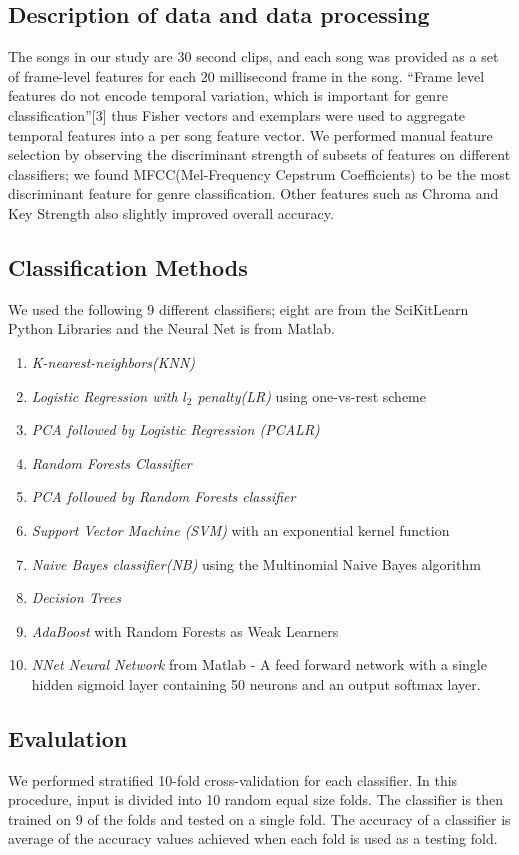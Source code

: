 \documentclass{article} %
\begin{document}
\subsection{Description of data and data processing}
The songs in our study are 30 second clips, and each song was provided as a set of frame-level features for each 20 millisecond frame in the song. ``Frame level features do not encode temporal variation, which is important for genre classification''[3] thus Fisher vectors and exemplars were used to aggregate temporal features into a per song feature vector. 
We performed manual feature selection by observing the discriminant strength of subsets of features on different classifiers; we found MFCC(Mel-Frequency Cepstrum Coefficients) to be the most discriminant feature for genre classification. Other features such as Chroma and Key Strength also slightly improved overall accuracy. 

\subsection{Classification Methods}
We used the following 9 different classifiers; eight are from the SciKitLearn Python Libraries and the Neural Net is from Matlab. 
\begin{enumerate}
    \item \textit{K-nearest-neighbors(KNN)} 
    \item \textit{Logistic Regression with $l_2$ penalty(LR)} using one-vs-rest scheme 
    \item \textit{PCA followed by Logistic Regression (PCALR)}
    \item \textit{Random Forests Classifier}
    \item \textit{PCA followed by Random Forests classifier}
    \item \textit{Support Vector Machine (SVM)} with an exponential kernel function
    \item \textit{Naive Bayes classifier(NB)} using the Multinomial Naive Bayes algorithm
    \item \textit{Decision Trees} 
    \item \textit{AdaBoost} with Random Forests as Weak Learners
    \item \textit{NNet Neural Network} from Matlab - A feed forward network with a single hidden sigmoid layer containing 50 neurons and an output softmax layer.
\end{enumerate}
 
\subsection{Evalulation}
We performed stratified 10-fold cross-validation for each classifier. In this procedure, input is divided into 10 random equal size folds. The classifier is then trained on 9 of the folds and tested on a single fold. The accuracy of a classifier is average of the accuracy values achieved when each fold is used as a testing fold.
\end{document}
